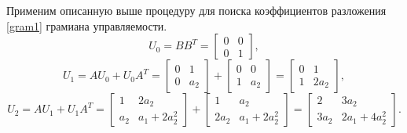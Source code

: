 \documentclass[../main.tex]{subfiles}
\begin{document}
 Применим описанную выше процедуру для поиска коэффициентов разложения \eqref{gram1} грамиана управляемости.
 \begin{equation*}
	 U_0 = B B^T =  \left[ {\begin{array}{*{20}{c}}
			 0&0\\
			 0&1
	 \end{array}}\right],
 \end{equation*}
 \begin{equation*}
	 U_1 = A U_0 + U_0 A^T = \left[ {\begin{array}{*{20}{c}}
			 0&1\\
			 0&a_2
	 \end{array}}\right] + \left[ {\begin{array}{*{20}{c}}
			 0&0\\
			 1&a_2
	 \end{array}}\right] = \left[ {\begin{array}{*{20}{c}}
			 0&1\\
			 1&2 a_2
	 \end{array}}\right],
 \end{equation*}
 \begin{equation*}
	 U_2 = A U_1 + U_1 A^T = \left[ {\begin{array}{*{20}{c}}
			 1&2a_2\\
			 a_2&a_1+2a_2^2
	 \end{array}}\right] + \left[ {\begin{array}{*{20}{c}}
			 1&a_2\\
			 2a_2&a_1+2a_2^2
	 \end{array}}\right] = \left[ {\begin{array}{*{20}{c}}
			 2&3a_2\\
			 3a_2&2a_1+4a_2^2
	 \end{array}}\right].
 \end{equation*}
 
\end{document}
